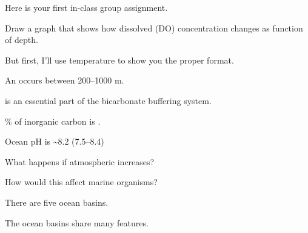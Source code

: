 \documentclass[t]{beamer}
\begin{document}
\begin{frame}[t,plain]{Here is your first in-class group assignment.}

	\hangpara Draw a graph that shows how dissolved  (DO) concentration changes as function of depth.

	\hangpara But first, I'll use temperature to show you the proper format.	
	
\end{frame}

{
\begin{frame}[b,plain]{An  occurs between 200–1000 m.}
\end{frame}
}


\begin{frame}[t,plain]{ is an essential part of the bicarbonate buffering system.}

	{\Large \begin{center}
	\end{center}}

	\% of inorganic carbon is .
	
	\hangpara Ocean pH is \textasciitilde8.2 (7.5–8.4)
	
	\pause\hangpara What happens if atmospheric  increases?
	
	\hangpara How would this affect marine organisms?
	
\end{frame}

{
\begin{frame}[b,plain]{There are five ocean basins.}
\end{frame}
}

{
\begin{frame}[b,plain]{The ocean basins share many features.}
\end{frame}
}
\end{document}
